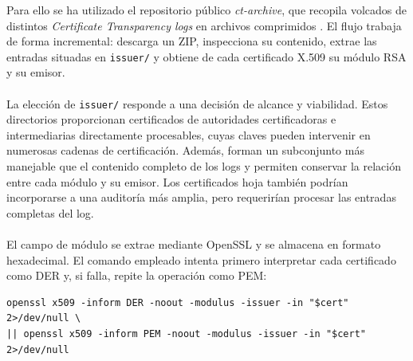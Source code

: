 Para ello se ha utilizado el repositorio público \textit{ct-archive}, que recopila volcados de distintos \textit{Certificate Transparency logs} en archivos comprimidos \citep{geomys2026ctarchive}. El flujo trabaja de forma incremental: descarga un ZIP, inspecciona su contenido, extrae las entradas situadas en \texttt{issuer/} y obtiene de cada certificado X.509 su módulo RSA y su emisor.
\\
\\
La elección de \texttt{issuer/} responde a una decisión de alcance y viabilidad. Estos directorios proporcionan certificados de autoridades certificadoras e intermediarias directamente procesables, cuyas claves pueden intervenir en numerosas cadenas de certificación. Además, forman un subconjunto más manejable que el contenido completo de los logs y permiten conservar la relación entre cada módulo y su emisor. Los certificados hoja también podrían incorporarse a una auditoría más amplia, pero requerirían procesar las entradas completas del log.
\\
\\
El campo de módulo se extrae mediante OpenSSL y se almacena en formato hexadecimal. El comando empleado intenta primero interpretar cada certificado como DER y, si falla, repite la operación como PEM:

\begin{verbatim}
openssl x509 -inform DER -noout -modulus -issuer -in "$cert" 2>/dev/null \
|| openssl x509 -inform PEM -noout -modulus -issuer -in "$cert" 2>/dev/null
\end{verbatim}


